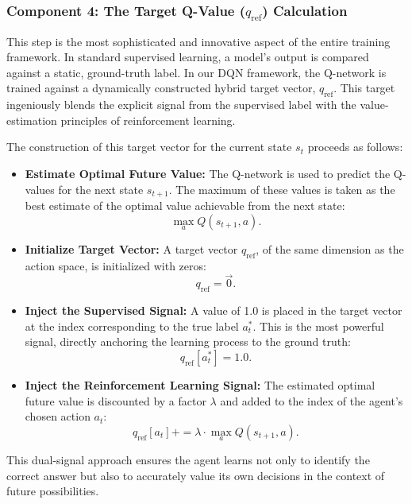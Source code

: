 \documentclass{report}
\begin{document}
\subsubsection{Component 4: The Target Q-Value ($q_{\text{ref}}$) Calculation}

This step is the most sophisticated and innovative aspect of the entire training framework. In standard supervised learning, a model's output is compared against a static, ground-truth label. In our DQN framework, the Q-network is trained against a dynamically constructed hybrid target vector, $q_{\text{ref}}$. This target ingeniously blends the explicit signal from the supervised label with the value-estimation principles of reinforcement learning.

The construction of this target vector for the current state $s_t$ proceeds as follows:

\begin{itemize}
    \item \textbf{Estimate Optimal Future Value:} The Q-network is used to predict the Q-values for the next state $s_{t+1}$. The maximum of these values is taken as the best estimate of the optimal value achievable from the next state:
    \[
    \max_a Q(s_{t+1}, a).
    \]
    
    \item \textbf{Initialize Target Vector:} A target vector $q_{\text{ref}}$, of the same dimension as the action space, is initialized with zeros:
    \[
    q_{\text{ref}} = \vec{0}.
    \]
    
    \item \textbf{Inject the Supervised Signal:} A value of 1.0 is placed in the target vector at the index corresponding to the true label $a_t^*$. This is the most powerful signal, directly anchoring the learning process to the ground truth:
    \[
    q_{\text{ref}}[a_t^*] = 1.0.
    \]
    
    \item \textbf{Inject the Reinforcement Learning Signal:} The estimated optimal future value is discounted by a factor $\lambda$ and added to the index of the agent’s chosen action $a_t$:
    \[
    q_{\text{ref}}[a_t] += \lambda \cdot \max_a Q(s_{t+1}, a).
    \]
\end{itemize}

This dual-signal approach ensures the agent learns not only to identify the correct answer but also to accurately value its own decisions in the context of future possibilities.
\end{document}
